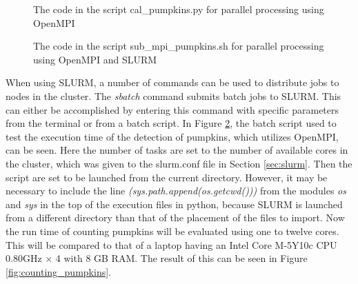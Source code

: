 \documentclass[../Head/Report.tex]{subfiles}
\begin{document}

\begin{figure}[H]
\centering
\begin{minipage}{0.9\textwidth}

\end{minipage}
\caption{The code in the script cal\_pumpkins.py for parallel processing using OpenMPI}
\label{fig:cal_pumpkins.py}
\end{figure}

\begin{figure}[H]
\centering
\begin{minipage}{0.9\textwidth}

\end{minipage}
\caption{The code in the script sub\_mpi\_pumpkins.sh for parallel processing using OpenMPI and SLURM}
\label{fig:sub_mpi_pumpkins.sh}
\end{figure}

When using SLURM, a number of commands can be used to distribute jobs to nodes in the cluster. The \textit{sbatch} command submits batch jobs to SLURM. This can either be accomplished by entering this command with specific parameters from the terminal or from a batch script. In Figure \ref{fig:sub_mpi_pumpkins.sh}, the batch script used to test the execution time of the detection of pumpkins, which utilizes OpenMPI, can be seen. Here the number of tasks are set to the number of available cores in the cluster, which was given to the slurm.conf file in Section \ref{sec:slurm}. Then the script are set to be launched from the current directory. However, it may be necessary to include the line \textit{(sys.path.append(os.getcwd()))} from the modules \textit{os} and \textit{sys} in the top of the execution files in python, because SLURM is launched from a different directory than that of the placement of the files to import. Now the run time of counting pumpkins will be evaluated using one to twelve cores. This will be compared to that of a laptop having an Intel Core M-5Y10c CPU 0.80GHz $\times $ 4 with 8 GB RAM. The result of this can be seen in Figure \ref{fig:counting_pumpkins}. 
\end{document}

